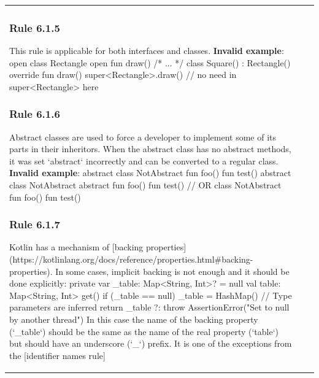 \begin{center}
\begin{tabular}{ |p{}|p{}|p{}| }
{{{{{\subsubsection*{\textbf{Rule 6.1.5}}
This rule is applicable for both interfaces and classes.
\textbf{Invalid example}:
open class Rectangle {
    open fun draw() { /* ... */ }
}
class Square() : Rectangle() {
    override fun draw() {
        super<Rectangle>.draw() // no need in super<Rectangle> here
    }
}
\subsubsection*{\textbf{Rule 6.1.6}}
Abstract classes are used to force a developer to implement some of its parts in their inheritors.
When the abstract class has no abstract methods, it was set `abstract` incorrectly and can be converted to a regular class.
\textbf{Invalid example}:
abstract class NotAbstract {
    fun foo() {}
    fun test() {}
}
abstract class NotAbstract {
    abstract fun foo()
    fun test() {}
}
// OR
class NotAbstract {
    fun foo() {}
    fun test() {}
}
\subsubsection*{\textbf{Rule 6.1.7}}
Kotlin has a mechanism of [backing properties](https://kotlinlang.org/docs/reference/properties.html\#backing-properties).
In some cases, implicit backing is not enough and it should be done explicitly:
private var _table: Map<String, Int>? = null
val table: Map<String, Int>
    get() {
        if (_table == null) {
            _table = HashMap() // Type parameters are inferred
        }
        return _table ?: throw AssertionError("Set to null by another thread")
    }
In this case the name of the backing property (`_table`) should be the same as the name of the real property (`table`) but should have an underscore (`_`) prefix.
It is one of the exceptions from the [identifier names rule]
}}}}}
\end{tabular}
\end{center}

